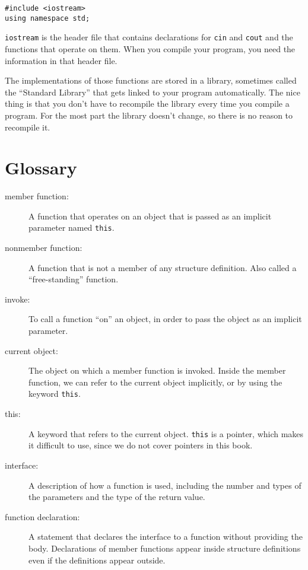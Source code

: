 {\begin{verbatim}
#include <iostream>
using namespace std;
\end{verbatim}
%
{\tt iostream} is the header file that contains declarations
for {\tt cin} and {\tt cout} and the functions that operate on
them.  When you compile your program, you need the information
in that header file.

The implementations of those functions are stored in a library,
sometimes called the ``Standard Library'' that gets linked to
your program automatically.  The nice thing is that you don't
have to recompile the library every time you compile a program.
For the most part the library doesn't change, so there is no
reason to recompile it.

\section{Glossary}

\begin{description}

\item[member function:]  A function that operates on an object
that is passed as an implicit parameter named {\tt this}.

\item[nonmember function:]  A function that is not a member
of any structure definition.  Also called a ``free-standing''
function.

\item[invoke:] To call a function ``on'' an object, in order to
pass the object as an implicit parameter.

\item[current object:]  The object on which a member function
is invoked.  Inside the member function, we can refer to the
current object implicitly, or by using the keyword {\tt this}.

\item[this:]  A keyword that refers to the current object.
{\tt this} is a pointer, which makes it difficult to use, since
we do not cover pointers in this book.

\item[interface:] A description of how a function is used, including
the number and types of the parameters and the type of the return
value.

\item[function declaration:] A statement that declares the interface
to a function without providing the body.  Declarations of
member functions appear inside structure definitions even if the
definitions appear outside.


\end{description}}
